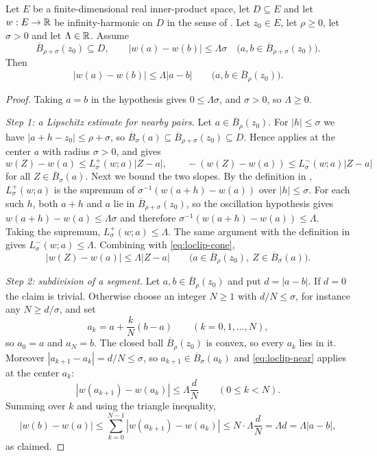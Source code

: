 \begin{lemma}
Let $E$ be a finite-dimensional real inner-product space, let $D\subseteq E$ and
let $w:E\to\mathbb{R}$ be infinity-harmonic on $D$ in the sense of
. Let $z_0\in E$, let $\rho\ge0$, let $\sigma>0$ and
let $\Lambda\in\mathbb{R}$. Assume
\[
  \overline B_{\rho+\sigma}(z_0)\subseteq D,\qquad
  |w(a)-w(b)|\le\Lambda\sigma
  \quad\bigl(a,b\in\overline B_{\rho+\sigma}(z_0)\bigr).
\]
Then
\[
  |w(a)-w(b)|\le\Lambda|a-b|
  \qquad\bigl(a,b\in\overline B_\rho(z_0)\bigr).
\]
\end{lemma}
\begin{proof}
Taking $a=b$ in the hypothesis gives $0\le\Lambda\sigma$, and $\sigma>0$, so
$\Lambda\ge0$.

\emph{Step 1: a Lipschitz estimate for nearby pairs.}
Let $a\in\overline B_\rho(z_0)$. For $|h|\le\sigma$ we have
$|a+h-z_0|\le\rho+\sigma$, so $\overline B_\sigma(a)\subseteq
\overline B_{\rho+\sigma}(z_0)\subseteq D$. Hence 
applies at the center $a$ with radius $\sigma>0$, and gives
\begin{equation}\label{eq:loclip-cone}
  w(Z)-w(a)\le L_\sigma^+(w;a)|Z-a|,\qquad
  -(w(Z)-w(a))\le L_\sigma^-(w;a)|Z-a|
\end{equation}
for all $Z\in\overline B_\sigma(a)$. Next we bound the two slopes. By the
definition in , $L_\sigma^+(w;a)$ is the supremum of
$\sigma^{-1}(w(a+h)-w(a))$ over $|h|\le\sigma$. For each such $h$, both $a+h$
and $a$ lie in $\overline B_{\rho+\sigma}(z_0)$, so the oscillation hypothesis
gives $w(a+h)-w(a)\le\Lambda\sigma$ and therefore
$\sigma^{-1}(w(a+h)-w(a))\le\Lambda$. Taking the supremum,
$L_\sigma^+(w;a)\le\Lambda$. The same argument with the definition in
 gives $L_\sigma^-(w;a)\le\Lambda$. Combining with
\eqref{eq:loclip-cone},
\begin{equation}\label{eq:loclip-near}
  |w(Z)-w(a)|\le\Lambda|Z-a|
  \qquad\bigl(a\in\overline B_\rho(z_0),\ Z\in\overline B_\sigma(a)\bigr).
\end{equation}

\emph{Step 2: subdivision of a segment.}
Let $a,b\in\overline B_\rho(z_0)$ and put $d=|a-b|$. If $d=0$ the claim is
trivial. Otherwise choose an integer $N\ge1$ with $d/N\le\sigma$, for instance
any $N\ge d/\sigma$, and set
\[
  a_k=a+\frac kN(b-a)\qquad(k=0,1,\ldots,N),
\]
so $a_0=a$ and $a_N=b$. The closed ball $\overline B_\rho(z_0)$ is convex, so
every $a_k$ lies in it. Moreover $|a_{k+1}-a_k|=d/N\le\sigma$, so
$a_{k+1}\in\overline B_\sigma(a_k)$ and \eqref{eq:loclip-near} applies at the
center $a_k$:
\[
  |w(a_{k+1})-w(a_k)|\le\Lambda\frac dN\qquad(0\le k<N).
\]
Summing over $k$ and using the triangle inequality,
\[
  |w(b)-w(a)|\le\sum_{k=0}^{N-1}|w(a_{k+1})-w(a_k)|
    \le N\cdot\Lambda\frac dN=\Lambda d=\Lambda|a-b|,
\]
as claimed.
\end{proof}
